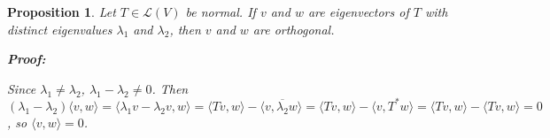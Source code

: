 \documentclass{article}
\theoremstyle{colontheorem}
\newtheorem{proposition}[theorem]{Proposition}
\newenvironment{Proposition}
{
	\begin{mdframed}[backgroundcolor=TheoremOrange!10]
	\begin{proposition}
}
{
	\end{proposition}
	\end{mdframed}
	
	\vspace{.15in}
}
\newenvironment{Proof}
{
	\begin{mdframed}[backgroundcolor=ProofPurple!10]
	\textbf{Proof:}%
}
{
	\end{mdframed}
	
	\vspace{.085in}
}
\begin{document}
\begin{Proposition}
	
	Let $T \in \mathcal{L}(V)$ be normal. If $v$ and $w$ are eigenvectors of $T$ with distinct eigenvalues $\lambda_1$ and $\lambda_2$, then $v$ and $w$ are orthogonal.
	
	\begin{Proof}
		Since $\lambda_1 \neq \lambda_2$, $\lambda_1 - \lambda_2 \neq 0$. Then $(\lambda_1 - \lambda_2) \langle v, w \rangle = \langle \lambda_1 v - \lambda_2 v, w \rangle = \langle Tv, w \rangle - \langle v, \overline{\lambda_2} w \rangle = \langle Tv, w \rangle - \langle v, T^* w \rangle = \langle Tv, w \rangle - \langle Tv, w \rangle = 0$, so $\langle v, w \rangle = 0$.
		
	\end{Proof}
	
\end{Proposition}
\end{document}

